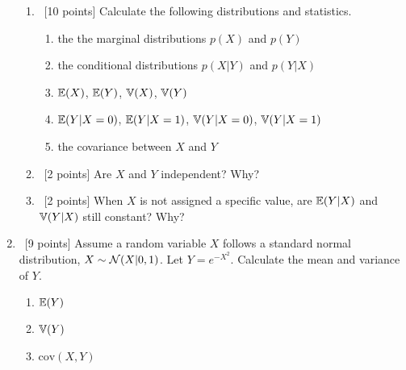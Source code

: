 \documentclass[12pt, fullpage,letterpaper]{article}
\begin{document}
\begin{enumerate}
        \begin{enumerate}
            \item~[10 points] Calculate the following distributions and statistics. 
            \begin{enumerate}
            \item the the marginal distributions $p(X)$ and $p(Y)$
            \item the conditional distributions $p(X|Y)$ and $p(Y|X)$
            \item $\mathbb{E}(X)$, $\mathbb{E}(Y)$, $\mathbb{V}(X)$, $\mathbb{V}(Y)$
            \item  $\mathbb{E}(Y|X=0)$, $\mathbb{E}(Y|X=1)$,  $\mathbb{V}(Y|X=0)$, $\mathbb{V}(Y|X=1)$ 
            \item  the covariance between $X$ and $Y$
            \end{enumerate}
            \item~[2 points] Are $X$ and $Y$ independent? Why?
            \item~[2 points] When $X$ is not assigned a specific value, are $\mathbb{E}(Y|X)$ and $\mathbb{V}(Y|X)$ still constant? Why?
        \end{enumerate}
\item~[9 points] Assume a random variable $X$ follows a standard normal distribution, \ie $X \sim \mathcal{N}(X|0, 1)$. Let $Y = e^{-X^2}$. Calculate the mean and variance of $Y$.
\begin{enumerate}
	\item $\mathbb{E}(Y)$
	\item $\mathbb{V}(Y)$
	\item $\text{cov}(X, Y)$
\end{enumerate}


\end{enumerate}
\end{document}
